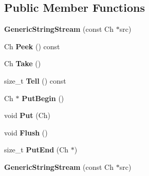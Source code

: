 \subsection*{Public Member Functions}
\begin{DoxyCompactItemize}
\item 
{\bfseries Generic\+String\+Stream} (const Ch $\ast$src)\hypertarget{struct_generic_string_stream_a6b20885ed64e33f5d081a1e83b07da06}{}\label{struct_generic_string_stream_a6b20885ed64e33f5d081a1e83b07da06}

\item 
Ch {\bfseries Peek} () const \hypertarget{struct_generic_string_stream_a87d794a70cf132f32521fb2b145ba58d}{}\label{struct_generic_string_stream_a87d794a70cf132f32521fb2b145ba58d}

\item 
Ch {\bfseries Take} ()\hypertarget{struct_generic_string_stream_a0d26e3e77e4fca64a87c2d71f48ac5e5}{}\label{struct_generic_string_stream_a0d26e3e77e4fca64a87c2d71f48ac5e5}

\item 
size\+\_\+t {\bfseries Tell} () const \hypertarget{struct_generic_string_stream_a71dde3ded678912be1ef56376a72a653}{}\label{struct_generic_string_stream_a71dde3ded678912be1ef56376a72a653}

\item 
Ch $\ast$ {\bfseries Put\+Begin} ()\hypertarget{struct_generic_string_stream_a88c908b4dac9773240ce4bca4b6dd837}{}\label{struct_generic_string_stream_a88c908b4dac9773240ce4bca4b6dd837}

\item 
void {\bfseries Put} (Ch)\hypertarget{struct_generic_string_stream_aaa59dc5313151a4125bf7840f87a33eb}{}\label{struct_generic_string_stream_aaa59dc5313151a4125bf7840f87a33eb}

\item 
void {\bfseries Flush} ()\hypertarget{struct_generic_string_stream_a5ff1a870d9334cd054cf4ca34c86ddc3}{}\label{struct_generic_string_stream_a5ff1a870d9334cd054cf4ca34c86ddc3}

\item 
size\+\_\+t {\bfseries Put\+End} (Ch $\ast$)\hypertarget{struct_generic_string_stream_a07b942bacda494afb3b2f7629cef14af}{}\label{struct_generic_string_stream_a07b942bacda494afb3b2f7629cef14af}

\item 
{\bfseries Generic\+String\+Stream} (const Ch $\ast$src)\hypertarget{struct_generic_string_stream_a6b20885ed64e33f5d081a1e83b07da06}{}\label{struct_generic_string_stream_a6b20885ed64e33f5d081a1e83b07da06}


\end{DoxyCompactItemize}
